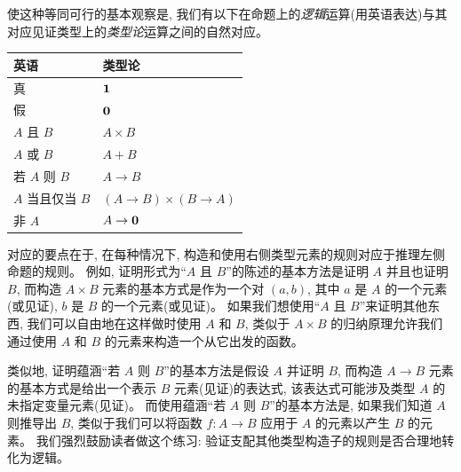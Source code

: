 %
%
使这种等同可行的基本观察是, 我们有以下在命题上的\emph{逻辑}运算(用英语表达)与其对应见证类型上的\emph{类型论}运算之间的自然对应。
%
%
%
%
%
\begin{center}
\medskip
\begin{tabular}{ll}
  \toprule
  英语 & 类型论\\
  \midrule
  真 & $\mathbf{1}$ \\
  假 & $\mathbf{0}$ \\
  $A$ 且 $B$ & $A \times B$ \\
  $A$ 或 $B$ & $A + B$ \\
  若 $A$ 则 $B$ & $A \to B$ \\
  $A$ 当且仅当 $B$ & $(A \to B) \times (B \to A)$ \\
  非 $A$ &  $A \to \mathbf{0}$ \\
  \bottomrule
\end{tabular}
\medskip
\end{center}

对应的要点在于, 在每种情况下, 构造和使用右侧类型元素的规则对应于推理左侧命题的规则。
例如, 证明形式为``$A$ 且 $B$''的陈述的基本方法是证明 $A$ 并且也证明 $B$, 而构造 $A\times B$ 元素的基本方式是作为一个对 $(a,b)$, 其中 $a$ 是 $A$ 的一个元素(或见证), $b$ 是 $B$ 的一个元素(或见证)。
如果我们想使用``$A$ 且 $B$''来证明其他东西, 我们可以自由地在这样做时使用 $A$ 和 $B$, 类似于 $A\times B$ 的归纳原理允许我们通过使用 $A$ 和 $B$ 的元素来构造一个从它出发的函数。

类似地, 证明蕴涵``若 $A$ 则 $B$''的基本方法是假设 $A$ 并证明 $B$, 而构造 $A\to B$ 元素的基本方式是给出一个表示 $B$ 元素(见证)的表达式, 该表达式可能涉及类型 $A$ 的未指定变量元素(见证)。
而使用蕴涵``若 $A$ 则 $B$''的基本方法是, 如果我们知道 $A$ 则推导出 $B$, 类似于我们可以将函数 $f:A\to B$ 应用于 $A$ 的元素以产生 $B$ 的元素。
我们强烈鼓励读者做这个练习: 验证支配其他类型构造子的规则是否合理地转化为逻辑。


